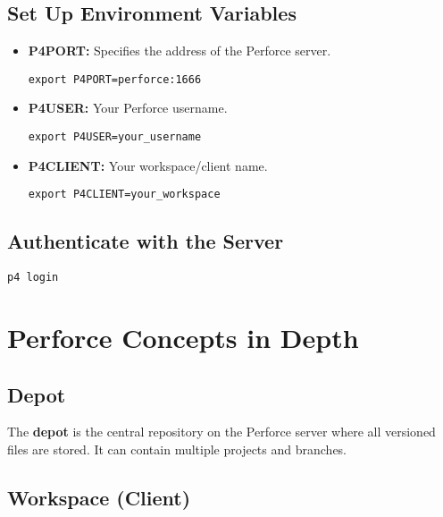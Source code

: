 \documentclass{article}
\begin{document}
\subsection{Set Up Environment Variables}

\begin{itemize}
    \item \textbf{P4PORT:} Specifies the address of the Perforce server.
    
    \begin{lstlisting}[style=bash]
export P4PORT=perforce:1666
    \end{lstlisting}
    
    \item \textbf{P4USER:} Your Perforce username.
    
    \begin{lstlisting}[style=bash]
export P4USER=your_username
    \end{lstlisting}
    
    \item \textbf{P4CLIENT:} Your workspace/client name.
    
    \begin{lstlisting}[style=bash]
export P4CLIENT=your_workspace
    \end{lstlisting}
\end{itemize}

\subsection{Authenticate with the Server}

\begin{lstlisting}[style=bash]
p4 login
\end{lstlisting}

\section{Perforce Concepts in Depth}

\subsection{Depot}

The \textbf{depot} is the central repository on the Perforce server where all versioned files are stored. It can contain multiple projects and branches.

\subsection{Workspace (Client)}
\end{document}
